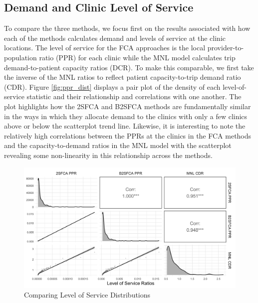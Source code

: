 \documentclass[]{elsarticle} %
\begin{document}
\hypertarget{demand-and-clinic-level-of-service}{%
\subsection{Demand and Clinic Level of
Service}\label{demand-and-clinic-level-of-service}}

To compare the three methods, we focus first on the results associated
with how each of the methods calculates demand and levels of service at
the clinic locations. The level of service for the FCA approaches is the
local provider-to-population ratio (PPR) for each clinic while the MNL
model calculates trip demand-to-patient capacity ratios (DCR). To make
this comparable, we first take the inverse of the MNL ratios to reflect
patient capacity-to-trip demand ratio (CDR). Figure \ref{fig:ppr_dist}
displays a pair plot of the density of each level-of-service statistic
and their relationship and correlations with one another. The plot
highlights how the 2SFCA and B2SFCA methods are fundamentally similar in
the ways in which they allocate demand to the clinics with only a few
clinics above or below the scatterplot trend line. Likewise, it is
interesting to note the relatively high correlations between the PPRs at
the clinics in the FCA methods and the capacity-to-demand ratios in the
MNL model with the scatterplot revealing some non-linearity in this
relationship across the methods.

\begin{figure}
\includegraphics[width=1\linewidth]{./img/pair_plot_ppr} \caption{\label{fig:ppr_dist}Comparing Level of Service Distributions}\label{fig:ppr_dist_fig}
\end{figure}
\end{document}
